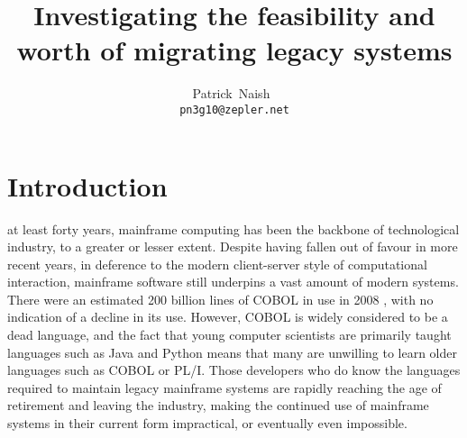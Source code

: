 \documentclass[12pt,journal,compsoc]{IEEEtran}
\begin{document}
\title{Investigating the feasibility and worth of migrating legacy systems}
\author{Patrick~Naish~\\\texttt{pn3g10@zepler.net}}




\maketitle

\IEEEdisplaynotcompsoctitleabstractindextext

\IEEEpeerreviewmaketitle

\section{Introduction}
\label{sec:introduction}

 at least forty years, mainframe computing has been the backbone of technological industry, to a greater or lesser extent. Despite having fallen out of favour in more recent years, in deference to the modern client-server style of computational interaction, mainframe software still underpins a vast amount of modern systems. There were an estimated 200 billion lines of COBOL in use in 2008 \cite{Datamonitor2008}, with no indication of a decline in its use. However, COBOL is widely considered to be a dead language, and the fact that young computer scientists are primarily taught languages such as Java \cite{Sneed2013} and Python means that many are unwilling to learn older languages such as COBOL or PL/I. Those developers who do know the languages required to maintain legacy mainframe systems are rapidly reaching the age of retirement and leaving the industry, making the continued use of mainframe systems in their current form impractical, or eventually even impossible.
\end{document}

